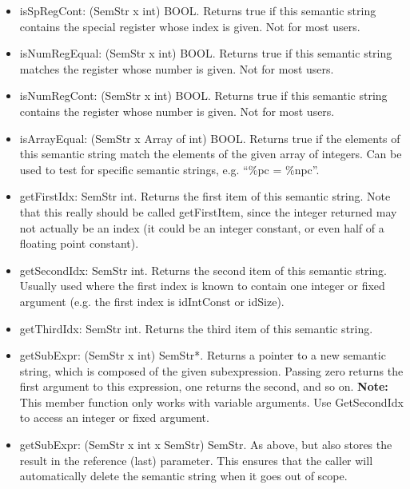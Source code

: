 \begin{itemize}
\item   isSpRegCont: (SemStr x int) \ra BOOL.
    Returns true if this semantic string contains the special register
    whose index is given. Not for most users.

\item   isNumRegEqual: (SemStr x int) \ra BOOL.
    Returns true if this semantic string matches the register
    whose number is given. Not for most users.

\item   isNumRegCont: (SemStr x int) \ra BOOL.
    Returns true if this semantic string contains the register
    whose number is given. Not for most users.

\item   isArrayEqual: (SemStr x Array of int) \ra BOOL.
    Returns true if the elements of this semantic string match the
    elements of the given array of integers. Can be used to test for
    specific semantic strings, e.g. ``\%pc = \%npc''.

\item   getFirstIdx: SemStr \ra int.
    Returns the first item of this semantic string. Note that this really
    should be called getFirstItem, since the integer returned may not actually
    be an index (it could be an integer constant, or even half of a floating
    point constant).

\item   getSecondIdx: SemStr \ra int.
    Returns the second item of this semantic string. Usually used where
    the first index is known to contain one integer or fixed argument
    (e.g. the first index is idIntConst or idSize).

\item   getThirdIdx: SemStr \ra int.
    Returns the third item of this semantic string.

\item   getSubExpr: (SemStr x int) \ra SemStr*.
    Returns a pointer to a new semantic string, which is composed of
    the given subexpression. Passing zero returns the first argument
    to this expression, one returns the second, and so on.
    {\bf Note:} This member function only works with variable arguments.
    Use GetSecondIdx to access an integer or fixed argument.

\item   getSubExpr: (SemStr x int x SemStr) \ra SemStr.
    As above, but also stores the result in the reference (last) parameter.
    This ensures that the caller will automatically delete the semantic string
    when it goes out of scope.


\end{itemize}
